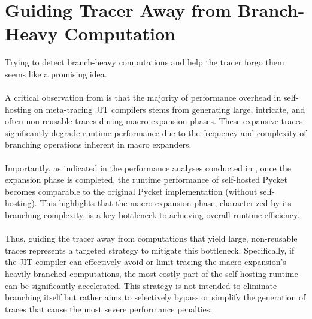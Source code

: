 	\section[\texorpdfstring{Guiding Tracer Away from Branch-Heavy Computation}{Hot Branches}]{Guiding Tracer Away from Branch-Heavy Computation}
    \label{section:hot-branches}
		\begin{mainpoint}
			Trying to detect branch-heavy computations and help the tracer forgo them seems like a promising idea.
		\end{mainpoint}

    \paragraph{}%
      A critical observation from  is that the majority of performance overhead in self-hosting on meta-tracing JIT compilers stems from generating large, intricate, and often non-reusable traces during macro expansion phases. These expansive traces significantly degrade runtime performance due to the frequency and complexity of branching operations inherent in macro expanders.

    \paragraph{}%
      Importantly, as indicated in the performance analyses conducted in , once the expansion phase is completed, the runtime performance of self-hosted Pycket becomes comparable to the original Pycket implementation (without self-hosting). This highlights that the macro expansion phase, characterized by its branching complexity, is a key bottleneck to achieving overall runtime efficiency.

    \paragraph{}%
      Thus, guiding the tracer away from computations that yield large, non-reusable traces represents a targeted strategy to mitigate this bottleneck. Specifically, if the JIT compiler can effectively avoid or limit tracing the macro expansion's heavily branched computations, the most costly part of the self-hosting runtime can be significantly accelerated. This strategy is not intended to eliminate branching itself but rather aims to selectively bypass or simplify the generation of traces that cause the most severe performance penalties.


